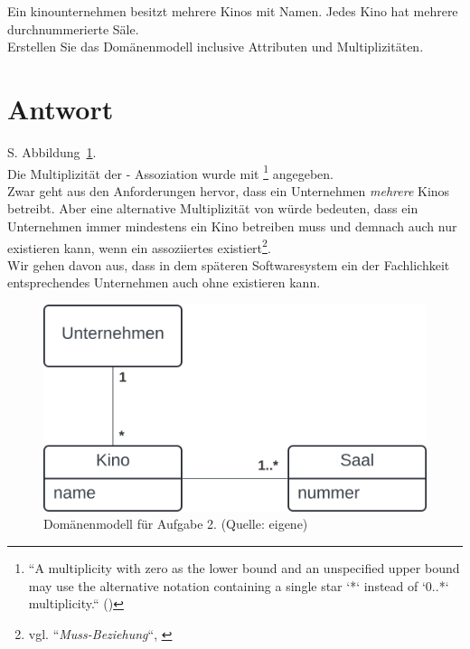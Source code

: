Ein kinounternehmen besitzt mehrere Kinos mit Namen.
Jedes Kino hat mehrere durchnummerierte Säle.\\
Erstellen Sie das Domänenmodell inclusive Attributen und Multiplizitäten.


\section*{Antwort}

S. Abbildung~\ref{fig:kino}.\\


\noindent
Die Multiplizität der  -  Assoziation wurde mit \code{*}\footnote{
    ``A multiplicity with zero as the lower bound and an unspecified upper bound may use the alternative notation containing a single star `*` instead of `0..*`
    multiplicity.`` (\cite[35]{UML17})
} angegeben.\\
Zwar geht aus den Anforderungen hervor, dass ein Unternehmen \textit{mehrere} Kinos betreibt.
Aber eine alternative Multiplizität von  würde bedeuten, dass ein Unternehmen immer mindestens ein Kino betreiben muss und demnach auch nur existieren kann, wenn ein assoziiertes  existiert\footnote{
vgl. ``\textit{Muss-Beziehung}``, \cite[166 ff.]{Bal05}
}.\\
Wir gehen davon aus, dass in dem späteren Softwaresystem ein der Fachlichkeit entsprechendes Unternehmen auch ohne  existieren kann.


\begin{figure}
    \centering
    \includegraphics[scale=0.4]{chapters/aufgabe 2/img/kino}
    \caption{Domänenmodell für Aufgabe 2. (Quelle: eigene)}
    \label{fig:kino}
\end{figure}